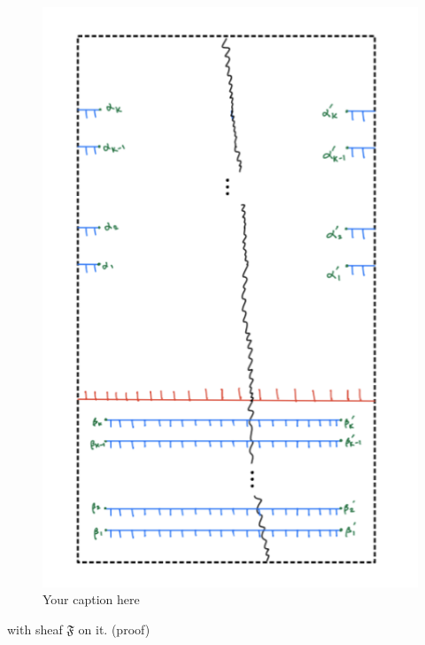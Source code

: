 \begin{figure}[H] %
    \centering
    \includegraphics[scale = 0.95]{diagrams/definition6/6.png} %
    \caption{Your caption here}
    \label{fig:your-label}
\end{figure}

with sheaf $\mathfrak{F}$ on it.
(proof)